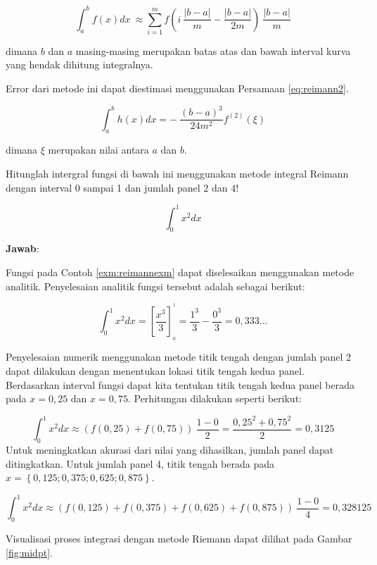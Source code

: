 \documentclass[]{book}
\theoremstyle{definition}
\theoremstyle{definition}
\theoremstyle{definition}
\theoremstyle{remark}
\let\BeginKnitrBlock\begin \let\EndKnitrBlock\end
\begin{document}
\begin{equation}
\int_a^bf\left(x\right)dx\ \approx\sum_{i=1}^mf\left(i\ \frac{\left|b-a\right|}{m}-\frac{\left|b-a\right|}{2m}\right)\ \frac{\left|b-a\right|}{m}
  \label{eq:reimann}
\end{equation}

dimana \(b\) dan \(a\) masing-masing merupakan batas atas dan bawah interval kurva yang hendak dihitung integralnya.

Error dari metode ini dapat diestimasi menggunakan Persamaan \eqref{eq:reimann2}.

\begin{equation}
\int_a^bh\left(x\right)dx=-\ \frac{\left(b-a\right)^3}{24m^2}f^{\left(2\right)}\left(\xi\right)
  \label{eq:reimann2}
\end{equation}

dimana \(\xi\) merupakan nilai antara \(a\) dan \(b\).

\BeginKnitrBlock{example}
\protect\hypertarget{exm:reimannexm}{}{\label{exm:reimannexm} }Hitunglah intergral fungsi di bawah ini menggunakan metode integral Reimann dengan interval 0 sampai 1 dan jumlah panel 2 dan 4!
\EndKnitrBlock{example}

\[
\int_0^1 x^2 dx
\]

\textbf{Jawab}:

Fungsi pada Contoh \ref{exm:reimannexm} dapat diselesaikan menggunakan metode analitik. Penyelesaian analitik fungsi tersebut adalah sebagai berikut:

\[
\int_0^1 x^2 dx = \left[\frac{x^3}{3}\right]_{_0}^{^1}=\frac{1^3}{3}-\frac{0^3}{3}=0,333...
\]

Penyelesaian numerik menggunakan metode titik tengah dengan jumlah panel 2 dapat dilakukan dengan menentukan lokasi titik tengah kedua panel. Berdasarkan interval fungsi dapat kita tentukan titik tengah kedua panel berada pada \(x=0,25\) dan \(x=0,75\). Perhitungan dilakukan seperti berikut:

\[
\int_0^1 x^2 dx \approx \left(f\left(0,25\right)+f\left(0,75\right)\right)\ \frac{1-0}{2}=\frac{0,25^2+0,75^2}{2}=0,3125
\]
Untuk meningkatkan akurasi dari nilai yang dihasilkan, jumlah panel dapat ditingkatkan. Untuk jumlah panel 4, titik tengah berada pada \(x=\left\{0,125;0,375;0,625;0,875\right\}\).

\[
\int_0^1 x^2 dx \approx \left(f\left(0,125\right)+f\left(0,375\right)+f\left(0,625\right)+f\left(0,875\right)\right)\ \frac{1-0}{4}=0,328125
\]

Visualisasi proses integrasi dengan metode Riemann dapat dilihat pada Gambar \ref{fig:midpt}.
\end{document}

